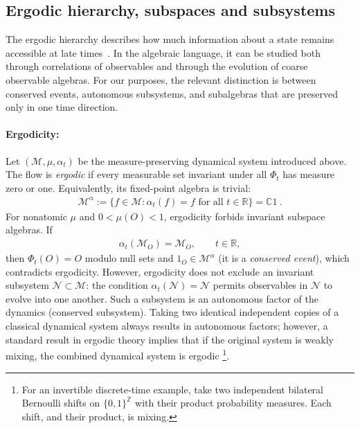 \documentclass[a4paper,11pt]{article}
\theoremstyle{definition}
\newcommand{\mN}{\mathcal{N}}
\newcommand{\mM}{\mathcal{M}}
\begin{document}
\subsection{Ergodic hierarchy, subspaces and subsystems}
\label{subsec:classical-ergodic-hierarchy}

The ergodic hierarchy describes how much information about a state remains accessible at late times~\cite{CornfeldFominSinai1982}. In the algebraic language, it can be studied both through correlations of observables and through the evolution of coarse observable algebras. For our purposes, the relevant distinction is between conserved events, autonomous subsystems, and subalgebras that are preserved only in one time direction.

\paragraph{Ergodicity:}
Let $(\mM,\mu,\alpha_t)$ be the measure-preserving dynamical system introduced above. The flow is {\it ergodic} if every measurable set invariant under all $\Phi_t$ has measure zero or one. Equivalently, its fixed-point algebra is trivial:
\begin{align}
    \mM^\alpha
    :=\{f\in\mM:\alpha_t(f)=f\text{ for all }t\in\mathbb R\}
    =\mathbb C1\ .
\end{align}
For nonatomic $\mu$ and $0<\mu(O)<1$, ergodicity forbids invariant subspace algebras. If
\begin{align}
    \alpha_t(\mM_O)=\mM_O,\qquad t\in\mathbb R,
\end{align}
then $\Phi_t(O)=O$ modulo null sets and $1_O\in\mM^\alpha$ (it is a {\it conserved event}), which contradicts ergodicity. However, ergodicity does not exclude an invariant subsystem $\mN\subset\mM$: the condition $\alpha_t(\mN)=\mN$ permits observables in $\mN$ to evolve into one another. Such a subsystem is an autonomous factor of the dynamics (conserved subsystem). Taking two identical independent copies of a classical dynamical system always results in autonomous factors; however, a standard result in ergodic theory implies that if the original system is weakly mixing, the combined dynamical system is ergodic \footnote{For an invertible discrete-time example, take two independent bilateral Bernoulli shifts on $\{0,1\}^{\mathbb Z}$ with their product probability measures. Each shift, and their product, is mixing.}.
\end{document}
